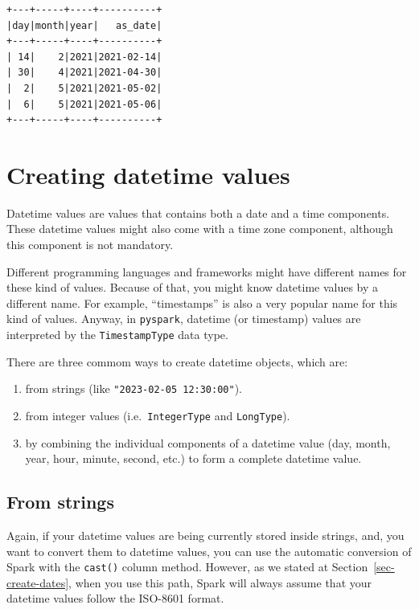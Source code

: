 \documentclass[
  11pt,
  letterpaper,
  DIV=11,
  numbers=noendperiod]{scrreprt}
\providecommand{\tightlist}{%
  \setlength{\itemsep}{0pt}\setlength{\parskip}{0pt}}\usepackage{longtable,booktabs,array}
\begin{document}
\begin{verbatim}
+---+-----+----+----------+
|day|month|year|   as_date|
+---+-----+----+----------+
| 14|    2|2021|2021-02-14|
| 30|    4|2021|2021-04-30|
|  2|    5|2021|2021-05-02|
|  6|    5|2021|2021-05-06|
+---+-----+----+----------+
\end{verbatim}

\hypertarget{creating-datetime-values}{%
\section{Creating datetime values}\label{creating-datetime-values}}

Datetime values are values that contains both a date and a time
components. These datetime values might also come with a time zone
component, although this component is not mandatory.

Different programming languages and frameworks might have different
names for these kind of values. Because of that, you might know datetime
values by a different name. For example, ``timestamps'' is also a very
popular name for this kind of values. Anyway, in \texttt{pyspark},
datetime (or timestamp) values are interpreted by the
\texttt{TimestampType} data type.

There are three commom ways to create datetime objects, which are:

\begin{enumerate}
\def\labelenumi{\arabic{enumi}.}
\tightlist
\item
  from strings (like \texttt{"2023-02-05\ 12:30:00"}).
\item
  from integer values (i.e.~\texttt{IntegerType} and \texttt{LongType}).
\item
  by combining the individual components of a datetime value (day,
  month, year, hour, minute, second, etc.) to form a complete datetime
  value.
\end{enumerate}

\hypertarget{from-strings-1}{%
\subsection{From strings}\label{from-strings-1}}

Again, if your datetime values are being currently stored inside
strings, and, you want to convert them to datetime values, you can use
the automatic conversion of Spark with the \texttt{cast()} column
method. However, as we stated at Section~\ref{sec-create-dates}, when
you use this path, Spark will always assume that your datetime values
follow the ISO-8601 format.
\end{document}
